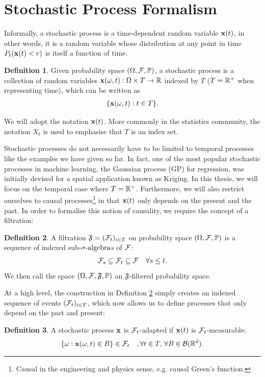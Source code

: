 \documentclass[a4paper,12pt,twoside,openright]{report}
\theoremstyle{definition}
\newtheorem{definition}{Definition}[section]
\begin{document}
\section{Stochastic Process Formalism}
Informally, a stochastic process is a time-dependent random variable ${\mathbf{x}}(t)$, in other words, it is a random variable whose distribution at any point in time $P_t({\mathbf{x}}(t) < r)$  is itself a function of time.
\begin{definition}\label{def:stochproc}
Given probability space ${(\Omega, \mathcal{F}, \mathbb{P})}$, a stochastic process is a collection of random variables ${\mathbf{x}}(\omega, t) : \Omega \times T \rightarrow \mathbb{R}$ indexed by $T$ ($T={\mathbb{R}}^{+}$  when representing time), which can be written as
\begin{align*}
    \{{\mathbf{x}}(\omega, t) : t \in T\}.
\end{align*}
\end{definition}
We will adopt the notation ${\mathbf{x}}(t)$. More commonly in the statistics community, the notation $X_t$ is used to emphasise that $T$ is an index set. 

Stochastic processes do not necessarily have to be limited to temporal processes like the examples we have given so far. In fact, one of the most popular stochastic processes in machine learning, the Gaussian process (GP) for regression, was initially devised for a spatial application known as Kriging. In this thesis, we will focus on the temporal case where $T={\mathbb{R}}^{+}$. Furthermore, we will also restrict ourselves to causal processes\footnote{Causal in the engineering and physics sense, e.g. causal Green's function.} in that ${\mathbf{x}}(t)$ only depends on the present and the past. In order to formalise this notion of causality, we require the concept of a filtration: 
\begin{definition}\label{def:filtration}
A filtration $\mathfrak{F} = ({\mathcal{F}}_{t})_{i\in T}$ on probability space ${(\Omega, \mathcal{F}, \mathbb{P})}$ is a sequence of indexed sub-${\sigma\text{-algebra}}$s of ${\mathcal{F}}$:
\begin{align*}
    {\mathcal{F}}_{s} \subseteq {\mathcal{F}}_{t} \subseteq {\mathcal{F}} \quad \forall  s \leq t.
\end{align*}
We then call the space ${(\Omega, \mathcal{F}, \mathfrak{F}, \mathbb{P})}$ an $\mathfrak{F}$-filtered probability space.
\end{definition}
At a high level, the construction in Definition \ref{def:filtration} simply creates an indexed sequence of events $({\mathcal{F}}_{t})_{i\in T}$, which now allows us to define processes that only depend on the past and present:
\begin{definition}\label{def:adapted}
    A stochastic process ${\mathbf{x}}$ is ${\mathcal{F}}_t$-adapted  if ${\mathbf{x}}(t)$ is ${\mathcal{F}}_t$-measurable:
    \begin{align*}
        \{\omega :{\mathbf{x}}(\omega,t) \in B\} \in {\mathcal{F}}_t \quad, \forall t \in T , \,\forall B \in {\mathcal{B}}({\mathbb{R}}^d).
    \end{align*}
\end{definition}
\end{document}
